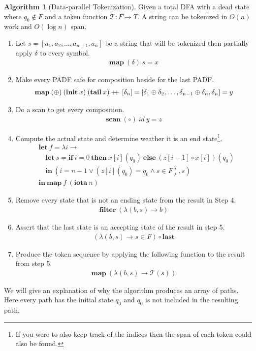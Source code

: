 \documentclass[a4paper,12pt]{article}
\theoremstyle{definition}
\newtheorem{algorithm}{Algorithm}[section]
\newcommand\doubleplus{+\kern-1.3ex+\kern0.8ex}
\begin{document}
\begin{algorithm}[Data-parallel Tokenization]\label{algo:token}
  Given a total DFA with a dead state where $q_0 \notin F$ and a token function $\mathcal{T}: F \to T$. A string can be tokenized in $O(n)$ work and $O(\log n)$ span.
  \begin{enumerate}
    \item Let $s = [a_1, a_2, \dots, a_{n - 1}, a_n]$ be a string that will be tokenized then partially apply $\delta$ to every symbol. 
    \begin{align*}
      \mathbf{map} \: (\delta) \: s = x
    \end{align*}
    \item Make every PADF safe for composition beside for the last PADF.
    \begin{align*}
      \mathbf{map} \: (\oplus) \: (\mathbf{init} \:x) \: (\mathbf{tail} \: x) \doubleplus [\delta_n] = [\delta_1 \oplus \delta_2, \dots, \delta_{n - 1} \oplus \delta_n, \delta_n] = y
    \end{align*}
    \item Do a scan to get every composition.
    \begin{align*}
      \mathbf{scan} \: (\circ) \: id \: y = z
    \end{align*}
    \item Compute the actual state and determine weather it is an end state\footnote{If you were to also keep track of the indices then the span of each token could also be found.}.
    \begin{align*}
      & \mathbf{let} \: f = \lambda i \to \\
      & \quad \mathbf{let} \: s = \mathbf{if} \: i = 0 \: \mathbf{then} \: x[i](q_0) \: \mathbf{else} \: (z[i - 1] \circ x[i])(q_0) \\
      & \quad \mathbf{in} \: (i = n - 1 \lor (z[i](q_0) = q_0 \land s \in F), s) \\
      & \mathbf{in} \: \mathbf{map} \: f \: (\mathbf{iota} \: n)
    \end{align*}
    \item Remove every state that is not an ending state from the result in Step 4.
    \begin{align*}
      \mathbf{filter} \: (\lambda(b, s) \to b)
    \end{align*}
    \item Assert that the last state is an accepting state of the result in step 5.
    \begin{align*}
       (\lambda(b, s) \to s \in F) \circ \mathbf{last}
    \end{align*}
    \item Produce the token sequence by applying the following function to the result from step 5.
    \begin{align*}
      \mathbf{map} \: (\lambda(b, s) \to \mathcal{T}(s))
    \end{align*}
  \end{enumerate}
\end{algorithm}
\noindent We will give an explanation of why the algorithm produces an array of paths. Here every path has the initial state $q_0$ and $q_0$ is not included in the resulting path.
\end{document}
